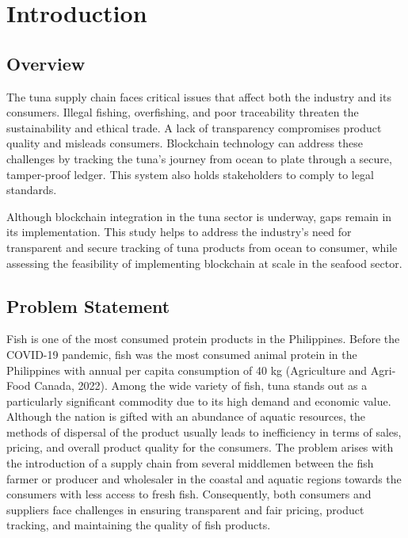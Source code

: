 \chapter{Introduction}
\label{sec:researchdesc}    %

\section{Overview}
\label{sec:overview}

The tuna supply chain faces critical issues that affect both the industry and its consumers. Illegal fishing, overfishing, and poor traceability threaten the sustainability and ethical trade. A lack of transparency compromises product quality and misleads consumers. Blockchain technology can address these challenges by tracking the tuna's journey from ocean to plate through a secure, tamper-proof ledger. This system also holds stakeholders to comply to legal standards.

\noindent Although blockchain integration in the tuna sector is underway, gaps remain in its implementation. This study helps to address the industry’s need for transparent and secure tracking of tuna products from ocean to consumer, while assessing the feasibility of implementing blockchain at scale in the seafood sector.


\section{Problem Statement}

Fish is one of the most consumed protein products in the Philippines. Before the COVID-19 pandemic, fish was the most consumed animal protein in the Philippines with annual per capita consumption of 40 kg (Agriculture and Agri-Food Canada, 2022). Among the wide variety of fish, tuna stands out as a particularly significant commodity due to its high demand and economic value. Although the nation is gifted with an abundance of aquatic resources, the methods of dispersal of the product usually leads to inefficiency in terms of sales, pricing, and overall product quality for the consumers. The problem arises with the introduction of a supply chain from several middlemen between the fish farmer or producer and wholesaler in the coastal and aquatic regions towards the consumers with less access to fresh fish. Consequently, both consumers and suppliers face challenges in ensuring transparent and fair pricing, product tracking, and maintaining the quality of fish products.



